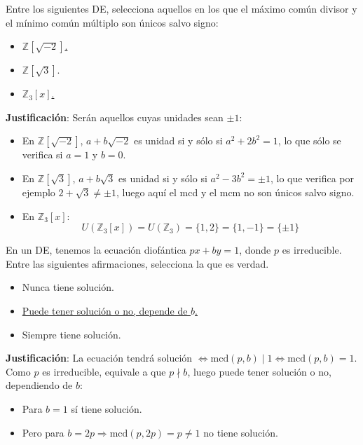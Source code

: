 \begin{ejercicio}
    Entre los siguientes DE, selecciona aquellos en los que el máximo común divisor y el mínimo común múltiplo son únicos salvo signo:
    \begin{itemize}
        \item \underline{$\mathbb{Z}\left[\sqrt{-2}\right]$.}
        \item $\mathbb{Z}\left[\sqrt{3}\right]$. 
        \item \underline{$\mathbb{Z}_3[x]$.}
    \end{itemize}

    \noindent
    \textbf{Justificación}:
    Serán aquellos cuyas unidades sean $\pm 1$:
    \begin{itemize}
        \item En $\mathbb{Z}\left[\sqrt{-2}\right]$, $a+b\sqrt{-2}$ es unidad si y sólo si $a^2 + 2b^2 =1$, lo que sólo se verifica si $a=1$ y $b=0$.
        \item En $\mathbb{Z}\left[\sqrt{3}\right]$, $a+b\sqrt{3}$ es unidad si y sólo si $a^2 - 3b^2 =\pm 1$, lo que verifica por ejemplo $2+\sqrt{3}\neq \pm 1$, luego aquí el mcd y el mcm no son únicos salvo signo.
        \item En $\mathbb{Z}_3[x]$:
            \begin{equation*}
                U\left(\mathbb{Z}_3[x]\right) = U\left(\mathbb{Z}_3\right) = \{1,2\} = \{ 1, -1 \} = \{ \pm 1\}
            \end{equation*}
    \end{itemize}
\end{ejercicio}

\begin{ejercicio}
    En un DE, tenemos la ecuación diofántica $px+by=1$, donde $p$ es irreducible. Entre las siguientes afirmaciones, selecciona la que es verdad.
    \begin{itemize}
        \item Nunca tiene solución.
        \item \underline{Puede tener solución o no, depende de $b$.} 
        \item Siempre tiene solución.
    \end{itemize}

    \noindent
    \textbf{Justificación}:
    La ecuación tendrá solución $\Longleftrightarrow \text{mcd}(p,b)\mid 1 \Longleftrightarrow \text{mcd}(p,b)=1$. Como $p$ es irreducible, equivale a que $p \nmid b$, luego puede tener solución o no, dependiendo de $b$:
    \begin{itemize}
        \item Para $b=1$ sí tiene solución.
        \item Pero para $b=2p \Longrightarrow \text{mcd}(p,2p)=p\neq 1$ no tiene solución.
    \end{itemize}
\end{ejercicio}

